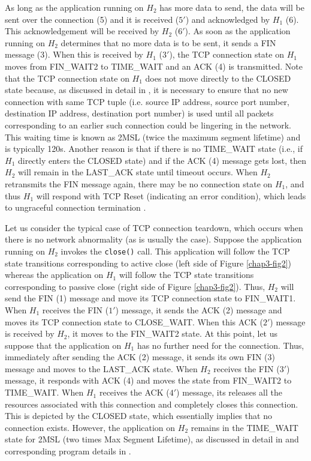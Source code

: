 \begin{multicols}{2}
As long as the application running on $H_{2}$ has more data to send, the data will be sent over the connection (5) and it is received ($5'$) and acknowledged by $H_{1}$ (6). This acknowledgement will be received by $H_{2}$ ($6'$). As soon as the application running on $H_{2}$ determines that no more data is to be sent, it sends a FIN message (3). When this is received by $H_{1}$ ($3'$), the TCP connection state on $H_{1}$ moves from FIN\_WAIT2 to TIME\_WAIT and an ACK (4) is transmitted. Note that the TCP connection state on $H_{1}$ does not move directly to the CLOSED state because, as discussed in detail in \cite{chap3-key8}, it is necessary to ensure that no new connection with same TCP tuple (i.e. source IP address, source port number, destination IP address,
destination port number) is used until all packets corresponding to an earlier such connection could be lingering in the network. This waiting time is known as 2MSL (twice the maximum segment lifetime) and is typically 120s. Another reason is that if there is no TIME\_WAIT state (i.e., if $H_{1}$ directly enters the CLOSED state) and if the ACK (4) message gets lost, then $H_{2}$ will remain in the LAST\_ACK state until timeout occurs. When $H_{2}$ retransmits the FIN message again, there may be no connection state on $H_{1}$, and thus $H_{1}$ will respond with TCP Reset (indicating an error condition), which leads to ungraceful connection termination \cite{chap3-key8}.

Let us consider the typical case of TCP connection teardown, which occurs when there is no network abnormality (as is usually the case). Suppose the application running on $H_{2}$ invokes the \lstinline|close()| call. This application will follow the TCP state transitions corresponding to active close (left side of Figure \ref{chap3-fig2}) whereas the application on $H_{1}$ will follow the TCP state transitions corresponding to passive close (right side of Figure \ref{chap3-fig2}). Thus, $H_{2}$ will send the FIN (1) message and move its TCP connection state to FIN\_WAIT1. When $H_{1}$ receives the FIN ($1'$) message, it sends the ACK (2) message and moves its TCP connection state to CLOSE\_WAIT. When this ACK ($2'$) message is received by $H_{2}$, it moves to the FIN\_WAIT2 state. At this point, let us suppose that the application on $H_{1}$ has no further need for the connection. Thus, immediately after sending the ACK (2) message, it sends its own FIN (3) message and moves to the LAST\_ACK state. When $H_{2}$ receives the FIN ($3'$) message, it responds with ACK (4) and moves the state from FIN\_WAIT2 to TIME\_WAIT. When $H_{1}$ receives the ACK ($4'$) message, its releases all the resources associated with this connection and completely closes this connection. This is depicted by the CLOSED state, which essentially implies that no connection exists. However, the application on $H_{2}$ remains in the TIME\_WAIT state for 2MSL (two times Max Segment Lifetime), as discussed in detail in \cite{chap3-key8} and corresponding program details in \cite{chap3-key9}.  


\end{multicols}

